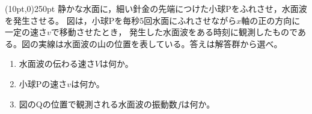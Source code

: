 \hakosyokika
\item
    \begin{mawarikomi}(10pt,0){250pt}{}
    静かな水面に，細い針金の先端につけた小球Pをふれさせ，水面波を発生させる。
    図は，小球Pを毎秒5回水面にふれさせながら$x$軸の正の方向に一定の速さ$v$で移動させたとき，
    発生した水面波をある時刻に観測したものである。図の実線は水面波の山の位置を表している。答えは解答群から選べ。
        \begin{enumerate}
            \item 水面波の伝わる速さ$V$は何か。
            \item 小球Pの速さ$v$は何か。
            \item 図のQの位置で観測される水面波の振動数$f$は何か。
        \end{enumerate}
    \end{mawarikomi}